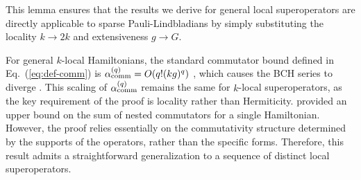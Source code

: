 \documentclass[aps,pra,reprint,groupedaddress,floatfix]{revtex4-2}
\newcommand{\eq}[1]{(\ref{eq:#1})}
\begin{document}
This lemma ensures that the results we derive for general local superoperators are directly applicable to sparse Pauli-Lindbladians by simply substituting the locality $k \to 2k$ and extensiveness $g \to G$.

For general $k$-local Hamiltonians, the standard commutator bound defined in Eq.~\eq{def-comm} is $\alpha_{\rm comm}^{(q)} = O( q! (kg)^q)$ \cite{childs2021theory,mizuta2025commutator}, which causes the BCH series to diverge \cite{mizuta2025commutator}. This scaling of $\alpha_{\rm comm}^{(q)}$ remains the same for $k$-local superoperators, as the key requirement of the proof is locality rather than Hermiticity. \citet{mizuta2025commutator} provided an upper bound on the sum of nested commutators for a single Hamiltonian. However, the proof relies essentially on the commutativity structure determined by the supports of the operators, rather than the specific forms. Therefore, this result admits a straightforward generalization to a sequence of distinct local superoperators.
\end{document}
